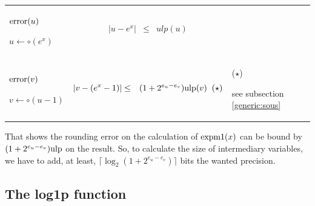 \documentclass[12pt]{amsart}
\def\n{\textnormal}
\def\ulp{{\rm ulp}}
\begin{document}
\begin{center}
\begin{tabular}{l l l}

\begin{minipage}{2.5cm}


${\textnormal{error}}(u)$


$u \leftarrow \circ(e^x)$

\end{minipage} &
\begin{minipage}{7.5cm}

\begin{eqnarray}\nonumber
  |u-e^x| &\leq& ulp(u)\\\nonumber
\end{eqnarray}

\end{minipage} &
\begin{minipage}{6cm}
{\hspace{7cm}}
\end{minipage}\\%
\begin{minipage}{2.5cm}
${\textnormal{error}}(v)$


$v \leftarrow \circ(u-1) $

\end{minipage} &
\begin{minipage}{7.5cm}

\begin{eqnarray}\nonumber
  |v-(e^x-1)| &\leq& (1+2^{e_u-e_v})\ulp(v)\;\;(\star)
\end{eqnarray}


\end{minipage} &
\begin{minipage}{6cm}
($\star$)

see subsection \ref{generic:sous}


\end{minipage}
\end{tabular}
\end{center}



That shows the rounding error on the calculation of $\n{expm1}(x)$ can be
bound by $(1+2^{e_u-e_v}) \ulp$ on the result. So, to calculate the size of
intermediary variables, we have to add, at least, $\lceil \log_2 (1+2^{e_u-e_v})\rceil$ bits the wanted precision.

\subsection{The log1p function}
\end{document}
